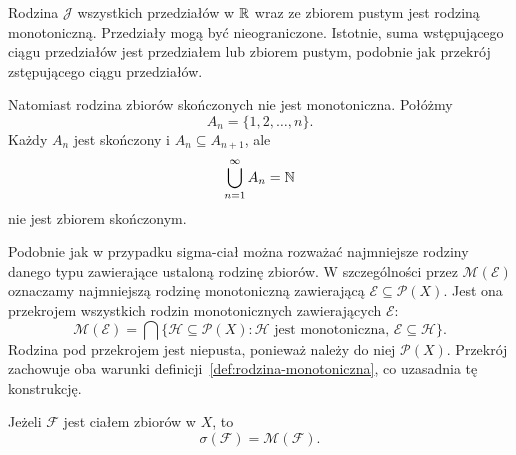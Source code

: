\begin{przyklad}
Rodzina $\mathcal{J}$ wszystkich przedziałów w $\mathbb{R}$ wraz ze zbiorem
pustym jest rodziną monotoniczną. Przedziały mogą być nieograniczone.
Istotnie, suma wstępującego ciągu przedziałów jest przedziałem
lub zbiorem pustym, podobnie jak przekrój zstępującego ciągu przedziałów.

Natomiast rodzina zbiorów skończonych nie jest monotoniczna.
Połóżmy
\[
  A_n=\{1,2,\ldots,n\}.
\]
Każdy $A_n$ jest skończony i $A_n\subseteq A_{n+1}$, ale
\[
  \bigcup_{n=1}^{\infty}A_n=\mathbb{N}
\]
nie jest zbiorem skończonym.
\end{przyklad}

\begin{uwaga}
Podobnie jak w przypadku sigma-ciał można rozważać najmniejsze rodziny
danego typu zawierające ustaloną rodzinę zbiorów.
W szczególności przez $\mathcal{M}(\mathcal{E})$ oznaczamy najmniejszą
rodzinę monotoniczną zawierającą
$\mathcal{E}\subseteq\mathcal{P}(X)$.
Jest ona przekrojem wszystkich rodzin monotonicznych zawierających
$\mathcal{E}$:
\begin{equation}
  \mathcal{M}(\mathcal{E})
  =\bigcap\{\mathcal{H}\subseteq\mathcal{P}(X):
    \mathcal{H}\text{ jest monotoniczna, }\mathcal{E}\subseteq\mathcal{H}\}.
  \label{eq:rodzina-monotoniczna-generowana}
\end{equation}
Rodzina pod przekrojem jest niepusta, ponieważ należy do niej
$\mathcal{P}(X)$. Przekrój zachowuje oba warunki
definicji~\ref{def:rodzina-monotoniczna}, co uzasadnia tę konstrukcję.
\end{uwaga}

\begin{twierdzenie}
\label{tw:rodzina-monotoniczna}
Jeżeli $\mathcal{F}$ jest ciałem zbiorów w $X$, to
\begin{equation}
  \sigma(\mathcal{F})=\mathcal{M}(\mathcal{F}).
  \label{eq:twierdzenie-monotoniczne}
\end{equation}
\end{twierdzenie}


